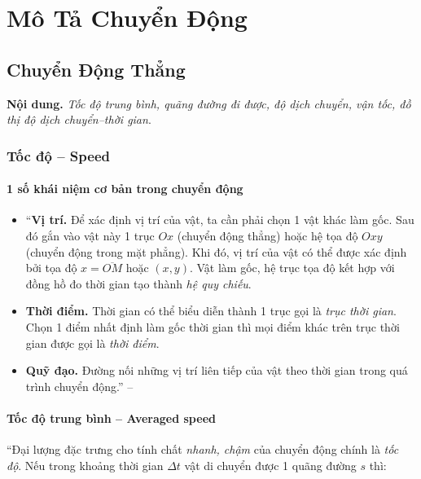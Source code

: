\documentclass[oneside]{book}
\numberwithin{equation}{section}
\begin{document}

\chapter{Mô Tả Chuyển Động}

\section{Chuyển Động Thẳng}
\textbf{Nội dung.} \textit{Tốc độ trung bình, quãng đường đi được, độ dịch chuyển, vận tốc, đồ thị độ dịch chuyển--thời gian}.

\subsection{Tốc độ -- Speed}

\subsubsection{1 số khái niệm cơ bản trong chuyển động}
\begin{itemize}
	\item ``\textbf{Vị trí.} Để xác định vị trí của vật, ta cần phải chọn 1 vật khác làm gốc. Sau đó gắn vào vật này 1 trục $Ox$ (chuyển động thẳng) hoặc hệ tọa độ $Oxy$ (chuyển động trong mặt phẳng). Khi đó, vị trí của vật có thể được xác định bởi tọa độ $x = \overline{OM}$ hoặc $(x,y)$. Vật làm gốc, hệ trục tọa độ kết hợp với đồng hồ đo thời gian tạo thành \textit{hệ quy chiếu}.
	\item \textbf{Thời điểm.} Thời gian có thể biểu diễn thành 1 trục gọi là \textit{trục thời gian}. Chọn 1 điểm nhất định làm gốc thời gian thì mọi điểm khác trên trục thời gian được gọi là \textit{thời điểm}.
	\item \textbf{Quỹ đạo.} Đường nối những vị trí liên tiếp của vật theo thời gian trong quá trình chuyển động.'' -- \cite[pp. 24]{SGK_Vat_Ly_10_Chan_Troi_Sang_Tao}
\end{itemize}

\subsubsection{Tốc độ trung bình -- Averaged speed}
``Đại lượng đặc trưng cho tính chất \textit{nhanh, chậm} của chuyển động chính là \textit{tốc độ}. Nếu trong khoảng thời gian $\Delta t$ vật di chuyển được 1 quãng đường $s$ thì:
\end{document}

